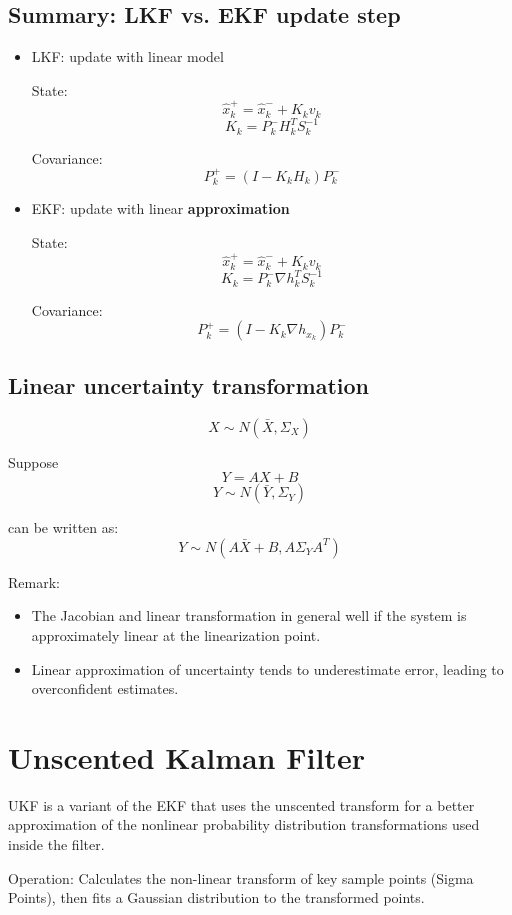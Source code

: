 \documentclass[11pt]{article}
\begin{document}
\subsection*{Summary: LKF vs. EKF update step}
\begin{itemize}
    \item LKF: update with linear model 
    
    State: 
    \[ \hat{x}^+_k = \hat{x}^-_k + K_k v_k \] 
    \[K_k = P_k^{-} H_k^T S_k^{-1} \]
    
    Covariance: \[ P_k^+ = (I - K_k H_{k}) P_k^- \]

    \item EKF: update with linear \textbf{approximation }
    
    State: 
    \[ \hat{x}^+_k = \hat{x}^-_k + K_k v_k \] 
    \[K_k = P_k^{-} \nabla h_k^T S_k^{-1} \]

    Covariance: \[ P_k^+ = (I - K_k \nabla h_{x_k}) P_k^- \]

\end{itemize}

\subsection*{Linear uncertainty transformation}

\[ X \sim N(\bar{X}, \Sigma_X) \]

Suppose \[ Y = AX + B \]
\[Y \sim N(\bar{Y}, \Sigma_Y) \]

can be written as:
\[ Y \sim N(A \bar{X} + B, A \Sigma_Y A^T) \]


Remark:
\begin{itemize}
    \item The Jacobian and linear transformation in general well if the system is approximately linear at the 
    linearization point.
    \item Linear approximation of uncertainty tends to underestimate error, leading to overconfident estimates.
\end{itemize}

\section{Unscented Kalman Filter}

UKF is a variant of the EKF that uses the unscented transform for a  better approximation of the nonlinear probability
distribution transformations used inside the filter.


Operation: Calculates the non-linear transform of key sample points (Sigma Points), then fits a Gaussian distribution
to the transformed points.
\end{document}
